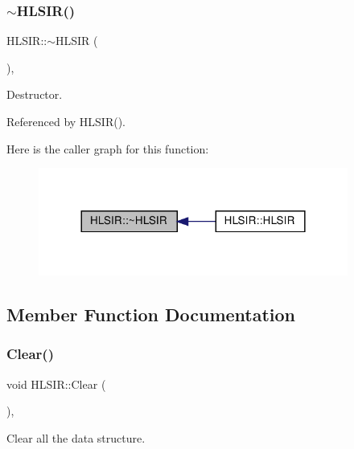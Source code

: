 \subsubsection{\texorpdfstring{$\sim$\+H\+L\+S\+I\+R()}{~HLSIR()}}
{\footnotesize\ttfamily H\+L\+S\+I\+R\+::$\sim$\+H\+L\+S\+IR (\begin{DoxyParamCaption}{ }\end{DoxyParamCaption})\hspace{0.3cm}{\ttfamily [override]}, {\ttfamily [default]}}



Destructor. 



Referenced by H\+L\+S\+I\+R().

Here is the caller graph for this function\+:
\nopagebreak
\begin{figure}[H]
\begin{center}
\leavevmode
\includegraphics[width=288pt]{d0/d25/classHLSIR_ae33f6261c9be10dc90ba34969ca64911_icgraph}
\end{center}
\end{figure}


\subsection{Member Function Documentation}
\mbox{\label{classHLSIR_afba475e313250d56bec388077d032624}} 
\subsubsection{\texorpdfstring{Clear()}{Clear()}}
{\footnotesize\ttfamily void H\+L\+S\+I\+R\+::\+Clear (\begin{DoxyParamCaption}{ }\end{DoxyParamCaption})\hspace{0.3cm}{\ttfamily [override]}, {}}



Clear all the data structure. 



